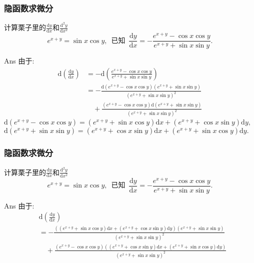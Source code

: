 \documentclass[
10pt,
aspectratio=43,
]{beamer}
\begin{document}
\begin{frame}
	\frametitle{隐函数求微分}
	\everymath{\displaystyle}
	\begin{exampleblock}{计算栗子里的$\frac{\mathrm{d}y}{\mathrm{d}x}$和$\frac{\mathrm{d}^2y}{\mathrm{d}x^2}$}
		$$
			e^{x+y}=\sin x\cos y,\,\,\, \text{已知}\,\,\, \frac{\mathrm{d}y}{\mathrm{d}x}=-\frac{e^{x+y}-\cos x\cos y}{e^{x+y}+\sin x\sin y}.
		$$
	\end{exampleblock}
	\begin{block}{Ans}
		由于:
		$$
			\begin{aligned}
				\mathrm{d}\left(\frac{\mathrm{d}y}{\mathrm{d}x}\right) & =-\mathrm{d}\left(\frac{e^{x+y}-\cos x\cos y}{e^{x+y}+\sin x\sin y}\right)                                                     \\
				                                                       & =-\frac{\mathrm{d}\left(e^{x+y}-\cos x\cos y\right)\left(e^{x+y}+\sin x\sin y\right)}{\left(e^{x+y}+\sin x\sin y\right)^2}     \\
				                                                       & \quad+\frac{\left(e^{x+y}-\cos x\cos y\right)\mathrm{d}\left(e^{x+y}+\sin x\sin y\right)}{\left(e^{x+y}+\sin x\sin y\right)^2}
			\end{aligned}
		$$
		$\mathrm{d}\left(e^{x+y}-\cos x\cos y\right)=\left(e^{x+y}+\sin x\cos y\right)\mathrm{d}x+\left(e^{x+y}+\cos x\sin y\right)\mathrm{d}y,$\\
		$\mathrm{d}\left(e^{x+y}+\sin x\sin y\right)=\left(e^{x+y}+\cos x\sin y\right)\mathrm{d}x+\left(e^{x+y}+\sin x\cos y\right)\mathrm{d}y.$
	\end{block}
\end{frame}

\begin{frame}
	\frametitle{隐函数求微分}
	\everymath{\displaystyle}
	\begin{exampleblock}{计算栗子里的$\frac{\mathrm{d}y}{\mathrm{d}x}$和$\frac{\mathrm{d}^2y}{\mathrm{d}x^2}$}
		$$
			e^{x+y}=\sin x\cos y,\,\,\, \text{已知}\,\,\, \frac{\mathrm{d}y}{\mathrm{d}x}=-\frac{e^{x+y}-\cos x\cos y}{e^{x+y}+\sin x\sin y}.
		$$
	\end{exampleblock}
	\begin{block}{Ans}
		由于:
		$$
			\begin{aligned}
				 & \mathrm{d}\left(\frac{\mathrm{d}y}{\mathrm{d}x}\right)                                                                                                                                    \\
				 & =-\frac{\left(\left(e^{x+y}+\sin x\cos y\right)\mathrm{d}x+\left(e^{x+y}+\cos x\sin y\right)\mathrm{d}y\right)\left(e^{x+y}+\sin x\sin y\right)}{\left(e^{x+y}+\sin x\sin y\right)^2}     \\
				 & \quad+\frac{\left(e^{x+y}-\cos x\cos y\right)\left(\left(e^{x+y}+\cos x\sin y\right)\mathrm{d}x+\left(e^{x+y}+\sin x\cos y\right)\mathrm{d}y\right)}{\left(e^{x+y}+\sin x\sin y\right)^2}
			\end{aligned}
		$$
	\end{block}
\end{frame}
\end{document}
